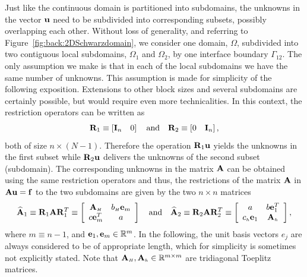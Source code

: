 Just like the continuous domain is partitioned into subdomains, the unknowns in the vector $\mathbf{u}$ need to be subdivided into corresponding subsets, possibly overlapping each other. Without loss of generality, and referring to Figure~\ref{fig:back:2DSchwarzdomain}, %
we consider one domain, $\Omega$, subdivided into two contiguous local subdomains, $\Omega_1$ and $\Omega_2$, by one interface boundary $\Gamma_{12}$. The only assumption we make is that in each of the local subdomains we have the same number of unknowns. This assumption is made for simplicity of the following exposition. Extensions to other block sizes and several subdomains are certainly possible, but would require even more technicalities. In this context, the restriction operators can be written as
%
$$\mathbf{R}_1\equiv \left[\mathbf{I}_{n}\quad 0 \right]\quad\mbox{and}\quad \mathbf{R}_2\equiv \left[0\quad  \mathbf{I}_{n} \right],$$
%
both of size $n\times (N-1)$.
Therefore the operation $\mathbf{R}_1\mathbf{u}$ yields the
unknowns in the first subset while $\mathbf{R}_2\mathbf{u}$ delivers the unknowns of the second
subset (subdomain). The corresponding unknowns in the matrix $\mathbf{A}$ can be
obtained using the same restriction operators and thus, the restrictions of the
matrix $\mathbf{A}$ in $\mathbf{A}\mathbf{u}=\mathbf{f}$ to the two subdomains are given by the two $n\times n$
matrices
%
\begin{equation}\label{eq:back:local_prob}
\widehat{\mathbf{A}}_1 \equiv \mathbf{R}_1\mathbf{A}\mathbf{R}_1^T \equiv
\left[\begin{array}{cc}
\mathbf{A}_{\scriptscriptstyle H} &b_{\scriptscriptstyle H}  \mathbf{e}_{m }\\
c \mathbf{e}_{m}^T& a
\end{array}\right]
\quad\mbox{and}\quad
\widehat{\mathbf{A}}_2\equiv \mathbf{R}_2\mathbf{A}\mathbf{R}_2^T\equiv
\left[\begin{array}{cc}
a &b \mathbf{e}_{1}^T\\
c_{\scriptscriptstyle h} \mathbf{e}_{1}& \mathbf{A}_{\scriptscriptstyle h}
\end{array}\right],
\end{equation}
%
where $m\equiv n-1$, and $\mathbf{e}_1,\mathbf{e}_m\in {\mathbb R}^m$. In the following, the
unit basis vectors $e_j$ are always considered to be of appropriate length,
which for simplicity is sometimes not explicitly stated. Note that
$\mathbf{A}_{\scriptscriptstyle H}, \mathbf{A}_{\scriptscriptstyle h}\in \mathbb{R}^{m\times m}$ are tridiagonal Toeplitz matrices.
